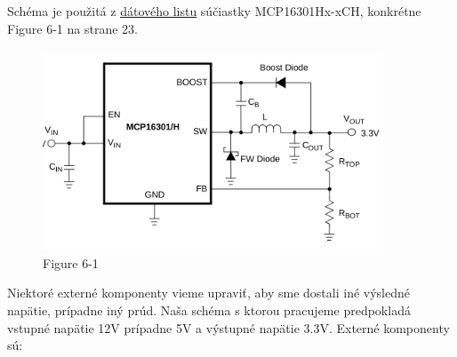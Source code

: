 \documentclass[12pt, twoside]{book}
\begin{document}
Schéma je použitá z \href{https://github.com/ostertag/UACS/blob/hardwear_kozuch/power_suply_shc_1/Data_sheet.pdf}{dátového listu} súčiastky
MCP16301Hx-xCH, konkrétne Figure 6-1 na strane 23.
\begin{figure}[h!]
    \centerline{\includegraphics[width=0.9\textwidth]{sch_original.png}}
    \caption{Figure 6-1 }
    \label{obr:shc2}
\end{figure}
Niektoré externé komponenty vieme upraviť, aby sme dostali iné výsledné
napätie, prípadne iný prúd.
Naša schéma s ktorou pracujeme predpokladá vstupné napätie 12V prípadne
5V a výstupné napätie 3.3V.
Externé komponenty sú: 
\end{document}
